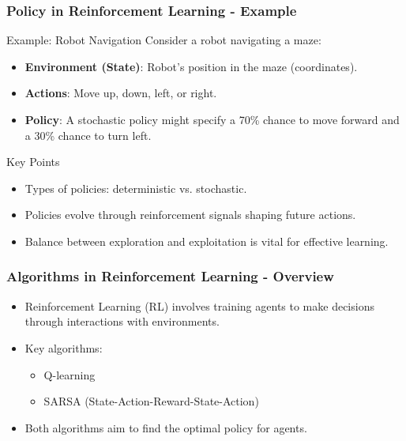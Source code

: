 \documentclass[aspectratio=169]{beamer}
\begin{document}
\begin{frame}[fragile]
    \frametitle{Policy in Reinforcement Learning - Example}
    \begin{block}{Example: Robot Navigation}
        Consider a robot navigating a maze:
    \end{block}
    \begin{itemize}
        \item \textbf{Environment (State)}: Robot's position in the maze (coordinates).
        \item \textbf{Actions}: Move up, down, left, or right.
        \item \textbf{Policy}: A stochastic policy might specify a 70\% chance to move forward and a 30\% chance to turn left.
    \end{itemize}
    \begin{block}{Key Points}
        \begin{itemize}
            \item Types of policies: deterministic vs. stochastic.
            \item Policies evolve through reinforcement signals shaping future actions.
            \item Balance between exploration and exploitation is vital for effective learning.
        \end{itemize}
    \end{block}
\end{frame}

\begin{frame}[fragile]
    \frametitle{Algorithms in Reinforcement Learning - Overview}
    \begin{itemize}
        \item Reinforcement Learning (RL) involves training agents to make decisions through interactions with environments.
        \item Key algorithms:
        \begin{itemize}
            \item Q-learning
            \item SARSA (State-Action-Reward-State-Action)
        \end{itemize}
        \item Both algorithms aim to find the optimal policy for agents.
    \end{itemize}
\end{frame}
\end{document}
